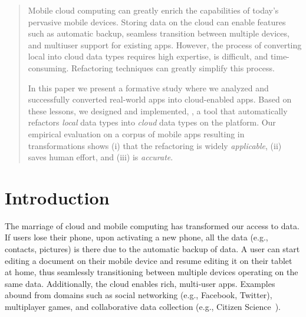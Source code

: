 \documentclass[article]{sigplanconf}
\begin{document}
\begin{abstract}
Mobile cloud computing can greatly enrich the capabilities of today's pervasive mobile devices. 
Storing data on the cloud can enable features such as automatic backup, seamless transition between multiple devices, 
and multiuser support for existing apps. 
However,  the process of converting local into cloud data types requires high expertise, is difficult, and time-consuming. 
Refactoring techniques can greatly simplify this process.
 
In this paper we present a formative study where we analyzed and successfully converted \numFormative real-world \TD apps into cloud-enabled apps. Based on these lessons, we designed and implemented, \tool, a tool that automatically refactors \emph{local} data types into \emph{cloud} data types on the \TD platform.
Our empirical evaluation on a corpus of \numScripts mobile apps resulting in \numTransformations transformations shows (i) that the refactoring is widely \emph{applicable}, (ii) \tool saves human effort, and (iii) \tool is \emph{accurate}. 

\end{abstract}


\section{Introduction}


The marriage of cloud and mobile computing has transformed our access to data. 
If users lose their phone, upon activating a new phone, all the data (e.g., contacts, pictures) is there due to the automatic backup of data.
A user can start editing a document on their mobile device and resume editing it on their tablet at home, thus seamlessly transitioning between multiple devices operating on the same data. Additionally, the cloud enables rich, multi-user apps. Examples abound from domains such as social networking (e.g., Facebook, Twitter), multiplayer games, and collaborative data collection (e.g., Citizen Science~\cite{cohn2008citizen}). 
\end{document}
